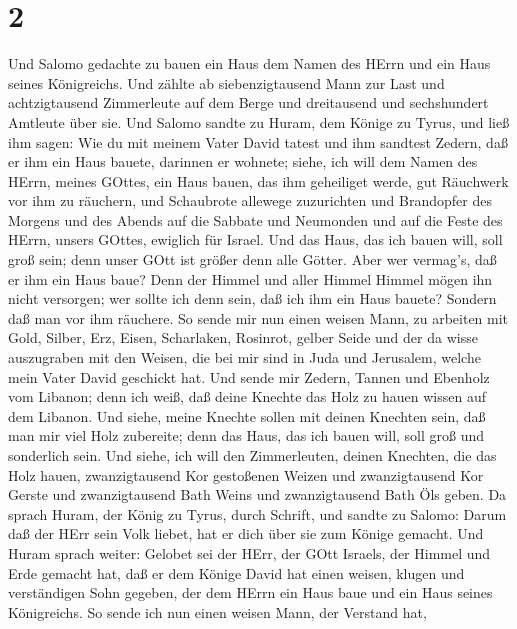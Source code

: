 \hypertarget{section-1}{%
\section{2}\label{section-1}}

 Und Salomo gedachte zu bauen ein Haus dem Namen des HErrn
und ein Haus seines Königreichs.  Und zählte ab
siebenzigtausend Mann zur Last und achtzigtausend Zimmerleute auf dem
Berge und dreitausend und sechshundert Amtleute über sie. 
Und Salomo sandte zu Huram, dem Könige zu Tyrus, und ließ ihm sagen: Wie
du mit meinem Vater David tatest und ihm sandtest Zedern, daß er ihm ein
Haus bauete, darinnen er wohnete;  siehe, ich will dem Namen
des HErrn, meines GOttes, ein Haus bauen, das ihm geheiliget werde, gut
Räuchwerk vor ihm zu räuchern, und Schaubrote allewege zuzurichten und
Brandopfer des Morgens und des Abends auf die Sabbate und Neumonden und
auf die Feste des HErrn, unsers GOttes, ewiglich für Israel.
 Und das Haus, das ich bauen will, soll groß sein; denn
unser GOtt ist größer denn alle Götter.  Aber wer vermag's,
daß er ihm ein Haus baue? Denn der Himmel und aller Himmel Himmel mögen
ihn nicht versorgen; wer sollte ich denn sein, daß ich ihm ein Haus
bauete? Sondern daß man vor ihm räuchere.  So sende mir nun
einen weisen Mann, zu arbeiten mit Gold, Silber, Erz, Eisen, Scharlaken,
Rosinrot, gelber Seide und der da wisse auszugraben mit den Weisen, die
bei mir sind in Juda und Jerusalem, welche mein Vater David geschickt
hat.  Und sende mir Zedern, Tannen und Ebenholz vom Libanon;
denn ich weiß, daß deine Knechte das Holz zu hauen wissen auf dem
Libanon. Und siehe, meine Knechte sollen mit deinen Knechten sein,
 daß man mir viel Holz zubereite; denn das Haus, das ich
bauen will, soll groß und sonderlich sein.  Und siehe, ich
will den Zimmerleuten, deinen Knechten, die das Holz hauen,
zwanzigtausend Kor gestoßenen Weizen und zwanzigtausend Kor Gerste und
zwanzigtausend Bath Weins und zwanzigtausend Bath Öls geben.
 Da sprach Huram, der König zu Tyrus, durch Schrift, und
sandte zu Salomo: Darum daß der HErr sein Volk liebet, hat er dich über
sie zum Könige gemacht.  Und Huram sprach weiter: Gelobet
sei der HErr, der GOtt Israels, der Himmel und Erde gemacht hat, daß er
dem Könige David hat einen weisen, klugen und verständigen Sohn gegeben,
der dem HErrn ein Haus baue und ein Haus seines Königreichs.
 So sende ich nun einen weisen Mann, der Verstand hat,
